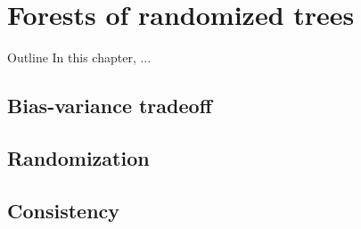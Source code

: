\chapter{Forests of randomized trees}\label{ch:forest}

\begin{remark}{Outline}
In this chapter, ...
\end{remark}

\section{Bias-variance tradeoff}

\section{Randomization}


\section{Consistency}


